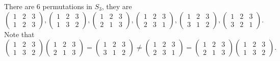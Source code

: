 \documentclass[main.tex]{subfiles}
\begin{document}
				\begin{example}
					There are 6 permutations in $S_3$, they are
					\begin{equation*}
					\begin{pmatrix}
					1 & 2 & 3\\
					1 & 2 & 3
					\end{pmatrix}, 
					\begin{pmatrix}
					1 & 2 & 3\\
					1 & 3 & 2
					\end{pmatrix}, 
					\begin{pmatrix}
					1 & 2 & 3\\
					2 & 1 & 3
					\end{pmatrix}, 
					\begin{pmatrix}
					1 & 2 & 3\\
					2 & 3 & 1
					\end{pmatrix}, 
					\begin{pmatrix}
					1 & 2 & 3\\
					3 & 1 & 2
					\end{pmatrix},
					\begin{pmatrix}
					1 & 2 & 3\\
					3 & 2 & 1
					\end{pmatrix}.
					\end{equation*}
								Note that
					\begin{equation*}
					\begin{pmatrix}
					1 & 2 & 3 \\
					1 & 3 & 2
					\end{pmatrix}
					\begin{pmatrix}
					1 & 2 & 3 \\
					2 & 1 & 3
					\end{pmatrix}
					= \begin{pmatrix}
					1 & 2 & 3 \\
					3 & 1 & 2
					\end{pmatrix}
					\neq
					\begin{pmatrix}
					1 & 2 & 3 \\
					2 & 3 & 1
					\end{pmatrix}
					= 	\begin{pmatrix}
					1 & 2 & 3 \\
					2 & 1 & 3
					\end{pmatrix}
					\begin{pmatrix}
					1 & 2 & 3 \\
					1 & 3 & 2
					\end{pmatrix}.
					\end{equation*}
				\end{example}
\end{document}
